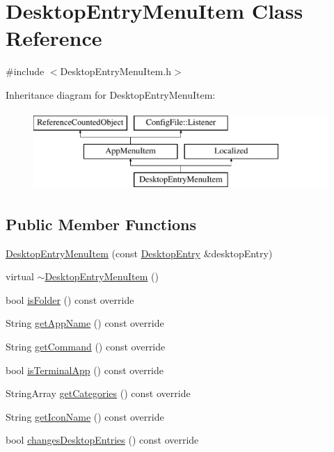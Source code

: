 \hypertarget{classDesktopEntryMenuItem}{}\section{Desktop\+Entry\+Menu\+Item Class Reference}
\label{classDesktopEntryMenuItem}


{\ttfamily \#include $<$Desktop\+Entry\+Menu\+Item.\+h$>$}

Inheritance diagram for Desktop\+Entry\+Menu\+Item\+:\begin{figure}[H]
\begin{center}
\leavevmode
\includegraphics[height=3.000000cm]{classDesktopEntryMenuItem}
\end{center}
\end{figure}
\subsection*{Public Member Functions}
\begin{DoxyCompactItemize}
\item 
\mbox{\hyperlink{classDesktopEntryMenuItem_a50adefcfca937d39fff8d79375637642}{Desktop\+Entry\+Menu\+Item}} (const \mbox{\hyperlink{classDesktopEntry}{Desktop\+Entry}} \&desktop\+Entry)
\item 
virtual \mbox{\hyperlink{classDesktopEntryMenuItem_abf055f6a6556a065821761bb7c3235df}{$\sim$\+Desktop\+Entry\+Menu\+Item}} ()
\item 
bool \mbox{\hyperlink{classDesktopEntryMenuItem_aad1d7a68badcde44cd25344e3b8382ab}{is\+Folder}} () const override
\item 
String \mbox{\hyperlink{classDesktopEntryMenuItem_a778402e3f98d1a2a64c9f6939b7aef8e}{get\+App\+Name}} () const override
\item 
String \mbox{\hyperlink{classDesktopEntryMenuItem_a544130c3a2984272cd80955dd3c9126d}{get\+Command}} () const override
\item 
bool \mbox{\hyperlink{classDesktopEntryMenuItem_a6018762c850c13febc94792c81dd7e33}{is\+Terminal\+App}} () const override
\item 
String\+Array \mbox{\hyperlink{classDesktopEntryMenuItem_a1bf16bd033c09fca27c950d45717c862}{get\+Categories}} () const override
\item 
String \mbox{\hyperlink{classDesktopEntryMenuItem_ad65fc5b9d5d94280ab02708cedbf742c}{get\+Icon\+Name}} () const override
\item 
bool \mbox{\hyperlink{classDesktopEntryMenuItem_a4c0415f2a01c9634efa99e9a78a39458}{changes\+Desktop\+Entries}} () const override
\end{DoxyCompactItemize}
